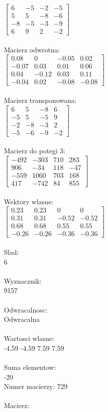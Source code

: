 \documentclass[a4paper,12pt]{article}
\begin{document}
$\begin{bmatrix} 6&-5&-2&-5\\5&5&-8&-6\\-8&-5&-3&-9\\6&9&2&-2 \end{bmatrix}$
\\
\\
Macierz odwrotna:\\

$\begin{bmatrix} 0.08&0&-0.05&0.02\\-0.07&0.03&0.01&0.06\\0.04&-0.12&0.03&0.11\\-0.04&0.02&-0.08&-0.08 \end{bmatrix}$
\\
\\
Macierz transponowana:\\

$\begin{bmatrix} 6&5&-8&6\\-5&5&-5&9\\-2&-8&-3&2\\-5&-6&-9&-2 \end{bmatrix}$
\\
\\
Macierz do potegi 3:\\

$\begin{bmatrix} -492&-303&710&283\\906&-34&118&-47\\-559&1060&703&168\\417&-742&84&855 \end{bmatrix}$
\\
\\
Wektory wlasne:\\

$\begin{bmatrix} 0.23&0.23&0&0\\0.31&0.31&-0.52&-0.52\\0.68&0.68&0.55&0.55\\-0.26&-0.26&-0.36&-0.36 \end{bmatrix}$
\\
\\
Slad:\\
6
\\
\\
Wyznacznik:\\
9157
\\
\\
Odwracalnosc:\\
Odwracalna
\\
\\
Wartosci wlasne:\\
-4.59 -4.59 7.59 7.59
\\
\\
Suma elementow:\\
-20
\\
\newpage
Numer macierzy:
729
\\
\\
Macierz:\\
\end{document}

